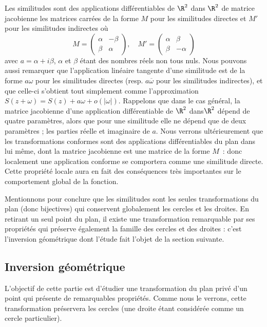 Les similitudes sont des applications différentiables de $\R^2$ dans $\R^2$ de matrice jacobienne les matrices carrées de la forme $M$ pour les similitudes directes et $M'$ pour les similitudes indirectes où
$$M=\begin{pmatrix}
\alpha&-\beta\\\beta&\alpha
\end{pmatrix}, \quad M'= \begin{pmatrix}
\alpha&\beta\\\beta&-\alpha
\end{pmatrix}$$               
avec $a=\alpha + i\beta$, $\alpha$ et $\beta$ étant des nombres réels non tous nuls. Nous pouvons aussi remarquer que l'application linéaire tangente d'une similitude est de la forme $a \omega$ pour les similitudes directes (resp. $a\overline{\omega}$ pour les similitudes indirectes), et que celle-ci s'obtient tout simplement comme l'approximation $S(z+\omega)=S(z) + a \omega + o(|\omega|)$. Rappelons que dans le cas général, la matrice jacobienne d'une application différentiable de $\R^2$ dans$\R^2$ dépend de quatre paramètres, alors que pour une similitude elle ne dépend que de deux paramètres ; les parties réelle et imaginaire de $a$. Nous verrons ultérieurement que les transformations conformes sont des applications différentiables du plan dans lui même, dont la matrice jacobienne est une matrice de la forme $M$~: donc localement une application conforme se comportera comme une similitude directe. Cette propriété locale aura en fait des conséquences très importantes sur le comportement global de la fonction.


Mentionnons pour conclure que les similitudes sont les seules transformations du plan (donc bijectives) qui conservent globalement les cercles et les droites. En retirant un seul point du plan, il existe une transformation remarquable par ses propriétés qui préserve également la famille des cercles et des droites : c'est l'inversion géométrique dont l'étude fait l'objet de la section suivante.



\subsection{Inversion géométrique}

L'objectif de cette partie est d'étudier une transformation du plan privé d'un point qui présente de remarquables propriétés. Comme nous le verrons, cette transformation préservera les cercles (une droite étant considérée comme un cercle particulier).

